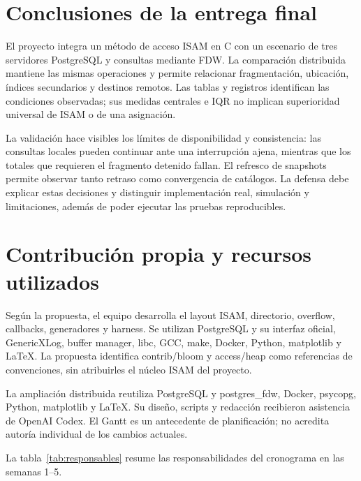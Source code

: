 \documentclass[11pt,a4paper]{article}
\begin{document}
\section{Conclusiones de la entrega final}
El proyecto integra un método de acceso ISAM en C con un escenario de tres
servidores PostgreSQL y consultas mediante FDW. La comparación distribuida
mantiene las mismas operaciones y permite relacionar fragmentación, ubicación,
índices secundarios y destinos remotos. Las tablas y registros identifican
las condiciones observadas; sus medidas centrales e IQR no implican
superioridad universal de ISAM o de una asignación.

La validación hace visibles los límites de disponibilidad y consistencia:
las consultas locales pueden continuar ante una interrupción ajena, mientras
que los totales que requieren el fragmento detenido fallan. El refresco de
snapshots permite observar tanto retraso como convergencia de catálogos.
La defensa debe explicar estas decisiones y distinguir implementación real,
simulación y limitaciones, además de poder ejecutar las pruebas reproducibles.

\section*{Contribución propia y recursos utilizados}
{}

Según la propuesta, el equipo desarrolla el layout ISAM, directorio, overflow,
callbacks, generadores y harness. Se utilizan PostgreSQL y su interfaz oficial,
GenericXLog, buffer manager, libc, GCC, make, Docker, Python, matplotlib y LaTeX.
La propuesta identifica contrib/bloom y access/heap como referencias de
convenciones, sin atribuirles el núcleo ISAM del proyecto.

La ampliación distribuida reutiliza PostgreSQL y postgres\_fdw, Docker, psycopg,
Python, matplotlib y LaTeX. Su diseño, scripts y redacción recibieron asistencia
de OpenAI Codex. El Gantt es un antecedente de planificación; no acredita
autoría individual de los cambios actuales.

La tabla~\ref{tab:responsables} resume las responsabilidades del cronograma en
las semanas 1--5.
\end{document}
